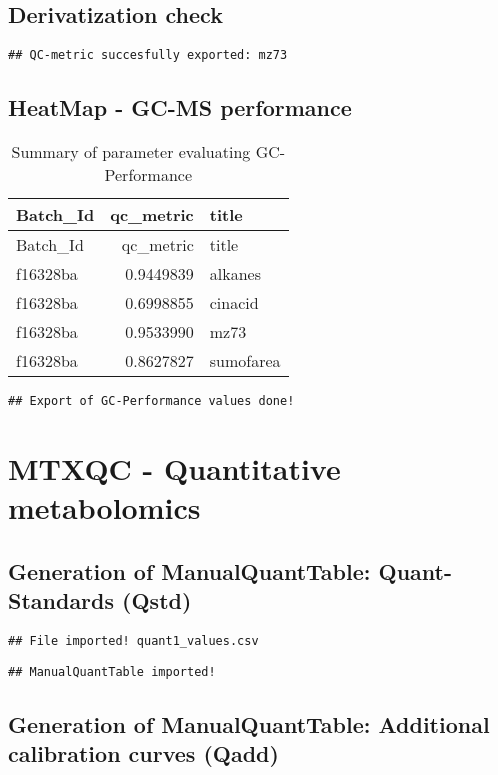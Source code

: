 \documentclass[9pt,]{article}
\begin{document}
\subsection{Derivatization check}\label{derivatization-check}

\begin{verbatim}
## QC-metric succesfully exported: mz73
\end{verbatim}

\subsection{HeatMap - GC-MS
performance}\label{heatmap---gc-ms-performance}

\begin{longtable}[]{@{}lrl@{}}
\caption{Summary of parameter evaluating GC-Performance}\tabularnewline
\toprule
Batch\_Id & qc\_metric & title\tabularnewline
\midrule
\endfirsthead
\toprule
Batch\_Id & qc\_metric & title\tabularnewline
\midrule
\endhead
f16328ba & 0.9449839 & alkanes\tabularnewline
f16328ba & 0.6998855 & cinacid\tabularnewline
f16328ba & 0.9533990 & mz73\tabularnewline
f16328ba & 0.8627827 & sumofarea\tabularnewline
\bottomrule
\end{longtable}

\begin{verbatim}
## Export of GC-Performance values done!
\end{verbatim}

\section{MTXQC - Quantitative
metabolomics}\label{mtxqc---quantitative-metabolomics}

\subsection{Generation of ManualQuantTable: Quant-Standards
(Qstd)}\label{generation-of-manualquanttable-quant-standards-qstd}

\begin{verbatim}
## File imported! quant1_values.csv
\end{verbatim}

\begin{verbatim}
## ManualQuantTable imported!
\end{verbatim}

\subsection{Generation of ManualQuantTable: Additional calibration
curves
(Qadd)}\label{generation-of-manualquanttable-additional-calibration-curves-qadd}
\end{document}
